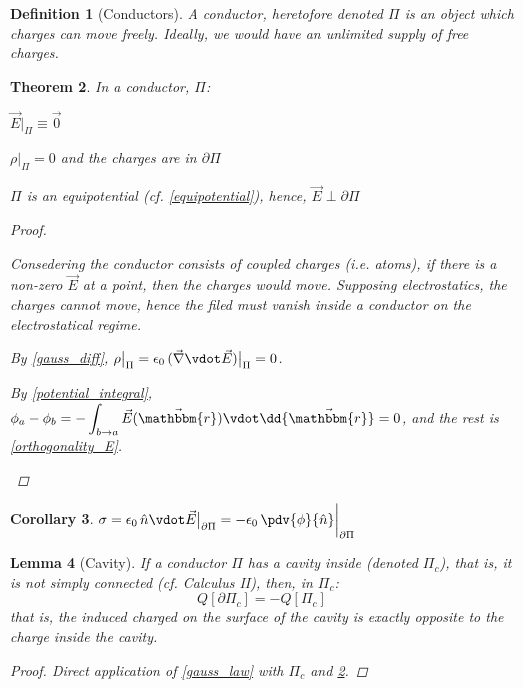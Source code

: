 \documentclass[12pt]{article}
\renewcommand{\div}{\vec{\nabla}\vdot}
\newcommand*{\irv}{\vec{\mathbbm{r}}}
\newcommand*{\vE}{\vec{E}}
\newcommand*{\ee}{\epsilon_0}
\newtheorem{theorem}{Theorem}[subsection]
\newtheorem{definition}[theorem]{Definition}
\newtheorem{lemma}[theorem]{Lemma}
\newtheorem{corollary}[theorem]{Corollary}
\begin{document}
\begin{definition}[Conductors]
  A conductor, heretofore denoted $\Pi$ is an object which charges can move freely. Ideally, we would have an unlimited supply of free charges.
\end{definition}

\begin{theorem}
  \label{conductors}
  In a conductor, $\Pi$:
  \begin{compactenum}
    \item $\vE\big|_\Pi\equiv\vec{0}$
    \item $\rho\big|_\Pi=0$ and the charges are in $\partial\Pi$
    \item $\Pi$ is an equipotential (cf. \ref{equipotential}), hence, $\vE\perp\partial\Pi$
  \end{compactenum}
  \begin{proof}
    \begin{compactenum}
      \item Consedering the conductor consists of coupled charges (i.e. atoms), if there is a non-zero $\vE$ at a point, then the charges would move. Supposing electrostatics, the charges cannot move, hence the filed must vanish inside a conductor on the electrostatical regime.
      \item By \ref{gauss_diff}, $\rho\big|_\Pi=\ee\,(\div\vE)\big|_\Pi=0$.
      \item By \ref{potential_integral}, $\displaystyle \phi_a-\phi_b=-\int_{b\to a}\vE(\irv)\vdot\dd{\irv}=0$, and the rest is \ref{orthogonality_E}.
    \end{compactenum}
  \end{proof}
\end{theorem}

\begin{corollary}
  \label{induced_cond}
  $\displaystyle\sigma=\ee\,\hat{n}\vdot\vE\big|_{\partial\Pi}=-\ee\,\pdv{\phi}{\hat{n}}\bigg|_{\partial\Pi}$
\end{corollary}

\begin{lemma}[Cavity]
  If a conductor $\Pi$ has a cavity inside (denoted $\Pi_c$), that is, it is not simply connected (cf. Calculus II), then, in $\Pi_c$: $$Q[\partial\Pi_c]=-Q[\Pi_c]$$
  that is, the induced charged on the surface of the cavity is exactly opposite to the charge inside the cavity.
  \begin{proof}
    Direct application of \ref{gauss_law} with $\Pi_c$ and \ref{conductors}.
  \end{proof}
\end{lemma}
\end{document}
